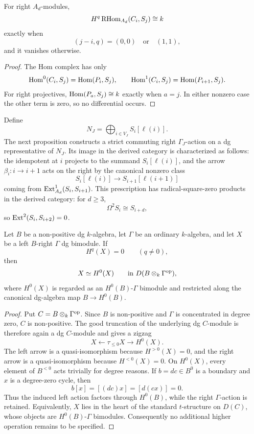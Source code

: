 \begin{lemma}\label{lem:cone-simple}
For right \(A_d\)-modules,
\[
 H^q\operatorname{RHom}_{A_d}(C_i,S_j)\cong k
\]
exactly when
\[
 (j-i,q)=(0,0)\quad\text{or}\quad(1,1),
\]
and it vanishes otherwise.
\end{lemma}

\begin{proof}
The Hom complex has only
\[
 \operatorname{Hom}^0(C_i,S_j)=\operatorname{Hom}(P_i,S_j),
 \qquad
 \operatorname{Hom}^1(C_i,S_j)=\operatorname{Hom}(P_{i+1},S_j).
\]
For right projectives, \(\operatorname{Hom}(P_a,S_j)\cong k\) exactly when \(a=j\).  In either nonzero case the other term is zero, so no differential occurs.
\end{proof}

Define
\[
 N_J=\bigoplus_{i\in V_J}S_i[\ell(i)].
\]
The next proposition constructs a strict commuting right \(\Gamma_J\)-action on a dg representative of \(N_J\).  Its image in the derived category is characterized as follows: the idempotent at \(i\) projects to the summand \(S_i[\ell(i)]\), and the arrow \(\beta_i:i\to i+1\) acts on the right by the canonical nonzero class
\[
 S_i[\ell(i)]\longrightarrow S_{i+1}[\ell(i+1)]
\]
coming from \(\operatorname{Ext}^1_{A_d}(S_i,S_{i+1})\).  This prescription has radical-square-zero products in the derived category: for \(d\ge3\),
\[
 \Omega^2S_i\cong S_{i+d},
\]
so \(\operatorname{Ext}^2(S_i,S_{i+2})=0\).

\begin{lemma}\label{lem:single-cohomology-bimodule}
Let \(B\) be a non-positive dg \(k\)-algebra, let \(\Gamma\) be an ordinary \(k\)-algebra, and let \(X\) be a left \(B\)-right \(\Gamma\) dg bimodule.  If
\[
 H^q(X)=0\qquad(q\ne0),
\]
then
\[
 X\simeq H^0(X)
 \qquad\text{in }D(B\otimes_k\Gamma^{\mathrm{op}}),
\]
where \(H^0(X)\) is regarded as an \(H^0(B)\)-\(\Gamma\) bimodule and restricted along the canonical dg-algebra map \(B\to H^0(B)\).
\end{lemma}

\begin{proof}
Put \(C=B\otimes_k\Gamma^{\mathrm{op}}\).  Since \(B\) is non-positive and \(\Gamma\) is concentrated in degree zero, \(C\) is non-positive.  The good truncation of the underlying dg \(C\)-module is therefore again a dg \(C\)-module and gives a zigzag
\[
 X\longleftarrow\tau_{\le0}X\longrightarrow H^0(X).
\]
The left arrow is a quasi-isomorphism because \(H^{>0}(X)=0\), and the right arrow is a quasi-isomorphism because \(H^{<0}(X)=0\).  On \(H^0(X)\), every element of \(B^{<0}\) acts trivially for degree reasons.  If \(b=dc\in B^0\) is a boundary and \(x\) is a degree-zero cycle, then
\[
 b[x]=[(dc)x]=[d(cx)]=0.
\]
Thus the induced left action factors through \(H^0(B)\), while the right \(\Gamma\)-action is retained.  Equivalently, \(X\) lies in the heart of the standard \(t\)-structure on \(D(C)\), whose objects are \(H^0(B)\)-\(\Gamma\) bimodules.  Consequently no additional higher operation remains to be specified.
\end{proof}

